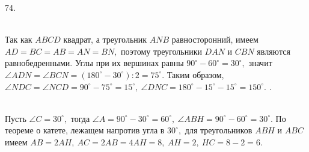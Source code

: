 74.  \begin{figure}[ht!]
\end{figure}\\
Так как $ABCD$ квадрат, а треугольник $ANB$ равносторонний, имеем $AD=BC=AB=AN=BN,$ поэтому треугольники $DAN$ и $CBN$ являются равнобедренными. Углы при их вершинах равны $90^\circ-60^\circ=30^\circ,$ значит $\angle ADN=\angle BCN=(180^\circ-30^\circ):2=75^\circ.$ Таким образом, $\angle NDC=\angle NCD=90^\circ-75^\circ=15^\circ,\ \angle DNC=180^\circ-15^\circ-15^\circ=150^\circ.$\newpage
{}. \begin{figure}[ht!]
\end{figure}\\
Пусть $\angle C=30^\circ,$ тогда $\angle A=90^\circ-30^\circ=60^\circ,\ \angle ABH=90^\circ-60^\circ=30^\circ.$ По теореме о катете, лежащем напротив угла в $30^\circ,$ для треугольников $ABH$ и $ABC$ имеем $AB=2AH,\ AC=2AB=4AH=8,\ AH=2,\ HC=8-2=6.$\\
